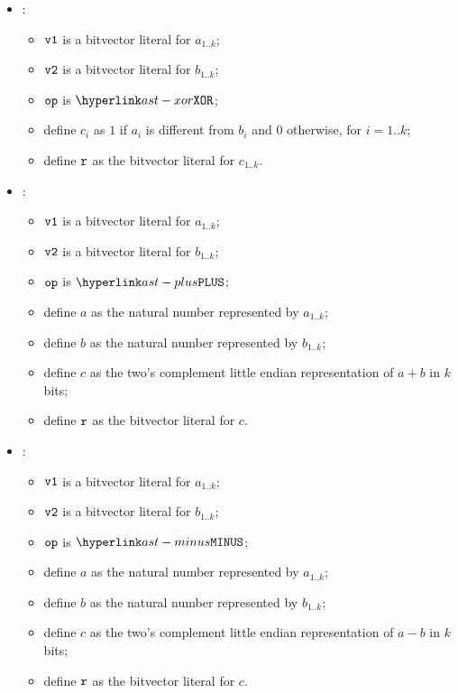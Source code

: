 \begin{itemize}
  \item {}:
  \begin{itemize}
    \item $\texttt{v1}$ is a bitvector literal for $a_{1..k}$;
    \item $\texttt{v2}$ is a bitvector literal for $b_{1..k}$;
    \item $\texttt{op}$ is $\XOR$;
    \item define $c_i$ as $1$ if $a_i$ is different from $b_i$ and $0$ otherwise, for $i=1..k$;
    \item define $\texttt{r}$ as the bitvector literal for $c_{1..k}$.
  \end{itemize}

  \item {}:
  \begin{itemize}
    \item $\texttt{v1}$ is a bitvector literal for $a_{1..k}$;
    \item $\texttt{v2}$ is a bitvector literal for $b_{1..k}$;
    \item $\texttt{op}$ is $\PLUS$;
    \item define $a$ as the natural number represented by $a_{1..k}$;
    \item define $b$ as the natural number represented by $b_{1..k}$;
    \item define $c$ as the two's complement little endian representation of $a+b$ in $k$ bits;
    \item define $\texttt{r}$ as the bitvector literal for $c$.
  \end{itemize}

  \item {}:
  \begin{itemize}
    \item $\texttt{v1}$ is a bitvector literal for $a_{1..k}$;
    \item $\texttt{v2}$ is a bitvector literal for $b_{1..k}$;
    \item $\texttt{op}$ is $\MINUS$;
    \item define $a$ as the natural number represented by $a_{1..k}$;
    \item define $b$ as the natural number represented by $b_{1..k}$;
    \item define $c$ as the two's complement little endian representation of $a-b$ in $k$ bits;
    \item define $\texttt{r}$ as the bitvector literal for $c$.
  \end{itemize}


\end{itemize}
